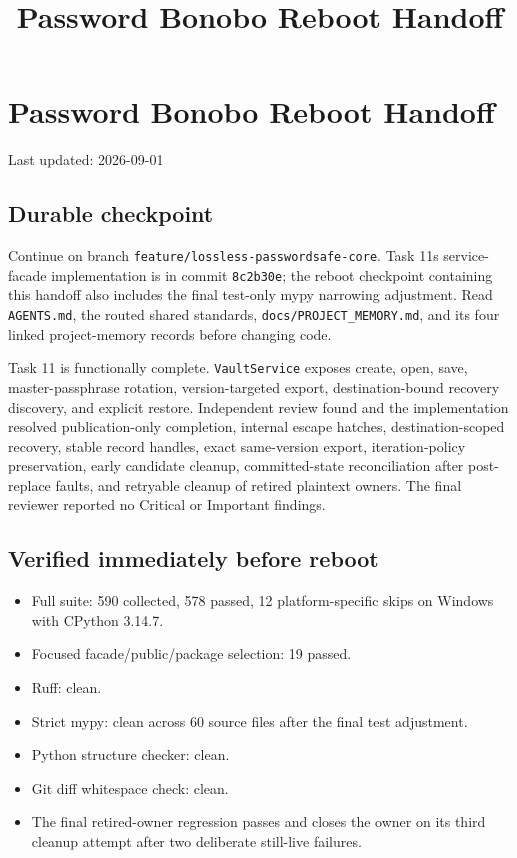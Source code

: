 \documentclass[
  letterpaper,
]{article}
\title{Password Bonobo Reboot Handoff}
\author{}
\date{}
\newcommand{\passthrough}[1]{#1}
\providecommand{\tightlist}{%
  \setlength{\itemsep}{0pt}\setlength{\parskip}{0pt}}
\begin{document}
\maketitle

{
\setcounter{tocdepth}{3}
\tableofcontents
}
\section{Password Bonobo Reboot Handoff}\label{password-bonobo-reboot-handoff}

Last updated: 2026-09-01

\subsection{Durable checkpoint}\label{durable-checkpoint}

Continue on branch \nolinkurl{feature/lossless-passwordsafe-core}. Task 11\textquotesingle s service-facade
implementation is in commit \passthrough{\lstinline!8c2b30e!}; the reboot checkpoint containing this handoff also
includes the final test-only mypy narrowing adjustment. Read \passthrough{\lstinline!AGENTS.md!}, the routed shared
standards, \nolinkurl{docs/PROJECT_MEMORY.md}, and its four linked project-memory records before changing code.

Task 11 is functionally complete. \nolinkurl{VaultService} exposes create, open, save, master-passphrase rotation,
version-targeted export, destination-bound recovery discovery, and explicit restore. Independent review found and the
implementation resolved publication-only completion, internal escape hatches, destination-scoped recovery, stable record
handles, exact same-version export, iteration-policy preservation, early candidate cleanup, committed-state
reconciliation after post-replace faults, and retryable cleanup of retired plaintext owners. The final reviewer reported
no Critical or Important findings.

\subsection{Verified immediately before reboot}\label{verified-immediately-before-reboot}

\begin{itemize}
\tightlist
\item
  Full suite: 590 collected, 578 passed, 12 platform-specific skips on Windows with CPython 3.14.7.
\item
  Focused facade/public/package selection: 19 passed.
\item
  Ruff: clean.
\item
  Strict mypy: clean across 60 source files after the final test adjustment.
\item
  Python structure checker: clean.
\item
  Git diff whitespace check: clean.
\item
  The final retired-owner regression passes and closes the owner on its third cleanup attempt after two deliberate
  still-live failures.
\end{itemize}
\end{document}
